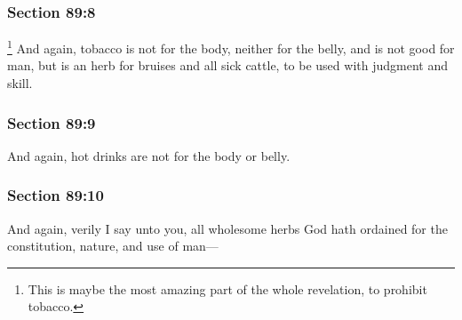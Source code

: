 	\subsubsection{Section 89:8} %
		\label{DC89-8}

			\footnote{%
				This is maybe the most amazing part of the whole revelation, to prohibit tobacco.
				}%
		And again, tobacco is not for the body, neither for the belly, and is not good for man, but is an herb for bruises and all sick cattle, to be used with judgment and skill.


	\subsubsection{Section 89:9} %
		\label{DC89-9}

		And again, hot drinks are not for the body or belly.


	\subsubsection{Section 89:10} %
		\label{DC89-10}

		And again, verily I say unto you, all wholesome herbs God hath ordained for the constitution, nature, and use of man---



